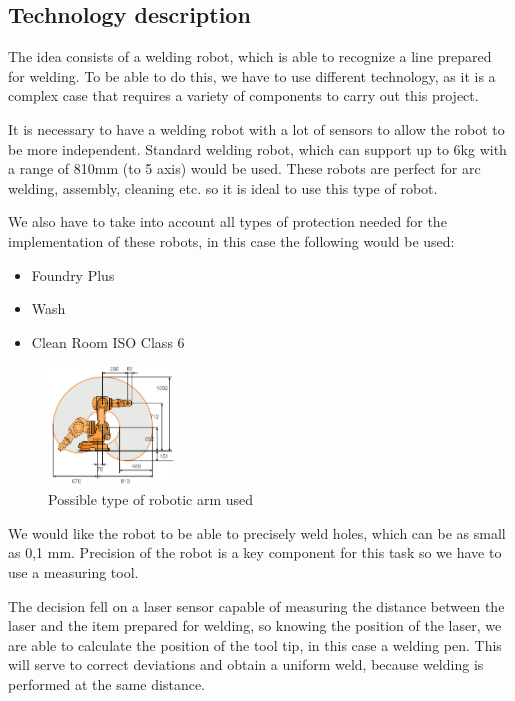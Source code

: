 \subsection{Technology description}

The idea consists of a welding robot, which is able to recognize a line prepared for welding. 
To be able to do this, we have to use different technology, as it is a complex case that requires a variety of components to carry out this project.

It is necessary to have a welding robot with a lot of sensors to allow the robot to be more independent. 
Standard welding robot, which can support up to 6kg with a range of 810mm (to 5 axis) would be used. 
These robots are perfect for arc welding, assembly, cleaning etc. so it is ideal to use this type of robot.

We also have to take into account all types of protection needed for the implementation of these robots, in this case the following would be used:
\begin{itemize}
\item Foundry Plus
\item Wash
\item Clean Room ISO Class 6
\end{itemize}

\begin{figure}[ht]
\centering
\includegraphics[width=0.3\textwidth]{./graphics/robot.png}
\caption{Possible type of robotic arm used}
\label{fig:robot}
\end{figure}

We would like the robot to be able to precisely weld holes, which can be as small as 0,1 mm. Precision of the robot is a key component for this task so we have to use a measuring tool.

The decision fell on a laser sensor capable of measuring the distance between the laser and the item prepared for welding, so knowing the position of the laser, we are able to calculate the position of the tool tip, in this case a welding pen. This will serve to correct deviations and obtain a uniform weld, because welding is performed at the same distance.

